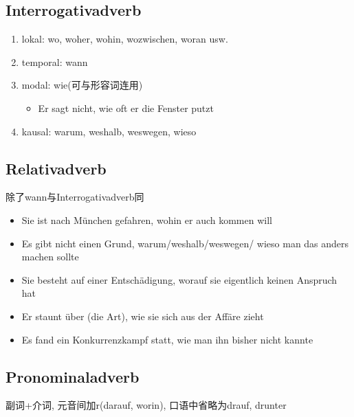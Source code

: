 \documentclass[UTF8]{report}
\begin{document}
\subsection{Interrogativadverb}
\begin{enumerate}
    \item lokal: wo, woher, wohin, wozwischen, woran usw.
    \item temporal: wann
    \item modal: wie(可与形容词连用)
    \begin{itemize}
        \item Er sagt nicht, wie oft er die Fenster putzt
    \end{itemize}
    \item kausal: warum, weshalb, weswegen, wieso
\end{enumerate}

\subsection{Relativadverb}
除了wann与Interrogativadverb同
\begin{itemize}
    \item Sie ist nach München gefahren, wohin er auch kommen will
    \item Es gibt nicht einen Grund, warum/weshalb/weswegen/ wieso man das anders machen sollte
    \item Sie besteht auf einer Entschädigung, worauf sie eigentlich keinen Anspruch hat
    \item Er staunt über (die Art), wie sie sich aus der Affäre zieht
    \item Es fand ein Konkurrenzkampf statt, wie man ihn bisher nicht kannte
\end{itemize}

\subsection{Pronominaladverb}
副词+介词, 元音间加r(darauf, worin), 口语中省略为drauf, drunter
\end{document}
